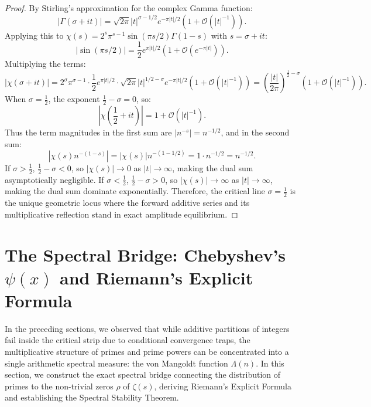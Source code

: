 \begin{proof}
\leanok
By Stirling's approximation for the complex Gamma function:
$$|\Gamma(\sigma + i t)| = \sqrt{2\pi} |t|^{\sigma - 1/2} e^{-\pi |t| / 2} \left(1 + \mathcal{O}\left(|t|^{-1}\right)\right).$$
Applying this to $\chi(s) = 2^s \pi^{s-1} \sin(\pi s / 2) \Gamma(1-s)$ with $s = \sigma + i t$:
$$|\sin(\pi s / 2)| = \frac{1}{2} e^{\pi |t| / 2} \left(1 + \mathcal{O}\left(e^{-\pi |t|}\right)\right).$$
Multiplying the terms:
$$|\chi(\sigma + i t)| = 2^\sigma \pi^{\sigma-1} \cdot \frac{1}{2} e^{\pi |t| / 2} \cdot \sqrt{2\pi} |t|^{1/2 - \sigma} e^{-\pi |t| / 2} \left(1 + \mathcal{O}\left(|t|^{-1}\right)\right) = \left(\frac{|t|}{2\pi}\right)^{\frac{1}{2} - \sigma} \left(1 + \mathcal{O}\left(|t|^{-1}\right)\right).$$
When $\sigma = \frac{1}{2}$, the exponent $\frac{1}{2} - \sigma = 0$, so:
$$\left|\chi\left(\frac{1}{2} + i t\right)\right| = 1 + \mathcal{O}\left(|t|^{-1}\right).$$
Thus the term magnitudes in the first sum are $|n^{-s}| = n^{-1/2}$, and in the second sum:
$$\left| \chi(s) n^{-(1-s)} \right| = |\chi(s)| n^{-(1 - 1/2)} = 1 \cdot n^{-1/2} = n^{-1/2}.$$
If $\sigma > \frac{1}{2}$, $\frac{1}{2} - \sigma < 0$, so $|\chi(s)| \to 0$ as $|t| \to \infty$, making the dual sum asymptotically negligible.
If $\sigma < \frac{1}{2}$, $\frac{1}{2} - \sigma > 0$, so $|\chi(s)| \to \infty$ as $|t| \to \infty$, making the dual sum dominate exponentially.
Therefore, the critical line $\sigma = \frac{1}{2}$ is the unique geometric locus where the forward additive series and its multiplicative reflection stand in exact amplitude equilibrium.
\end{proof}


\section{The Spectral Bridge: Chebyshev's \texorpdfstring{$\psi(x)$}{psi(x)} and Riemann's Explicit Formula}
\label{sec:spectral_bridge}

In the preceding sections, we observed that while additive partitions of integers fail inside the critical strip due to conditional convergence traps, the multiplicative structure of primes and prime powers can be concentrated into a single arithmetic spectral measure: the von Mangoldt function $\Lambda(n)$. In this section, we construct the exact spectral bridge connecting the distribution of primes to the non-trivial zeros $\rho$ of $\zeta(s)$, deriving Riemann's Explicit Formula and establishing the Spectral Stability Theorem.

